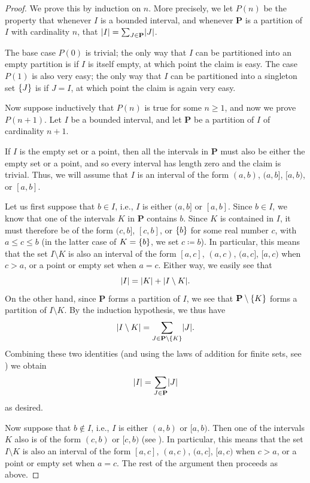 \begin{proof}
  We prove this by induction on \(n\).
  More precisely, we let \(P(n)\) be the property that whenever \(I\) is a bounded interval, and whenever \(\mathbf{P}\) is a partition of \(I\) with cardinality \(n\), that \(\abs{I} = \sum_{J \in \mathbf{P}} \abs{J}\).

  The base case \(P(0)\) is trivial;
  the only way that \(I\) can be partitioned into an empty partition is if \(I\) is itself empty, at which point the claim is easy.
  The case \(P(1)\) is also very easy;
  the only way that \(I\) can be partitioned into a singleton set \(\left\lbrace J\right\rbrace\) is if \(J = I\), at which point the claim is again very easy.

  Now suppose inductively that \(P(n)\) is true for some \(n \geq 1\), and now we prove \(P(n + 1)\).
  Let \(I\) be a bounded interval, and let \(\mathbf{P}\) be a partition of \(I\) of cardinality \(n + 1\).

  If \(I\) is the empty set or a point, then all the intervals in \(\mathbf{P}\) must also be either the empty set or a point, and so every interval has length zero and the claim is trivial.
  Thus, we will assume that \(I\) is an interval of the form \((a, b)\), \((a, b]\), \([a, b)\), or \([a, b]\).

      Let us first suppose that \(b \in I\), i.e., \(I\) is either \((a, b]\) or \([a, b]\).
  Since \(b \in I\), we know that one of the intervals \(K\) in \(\mathbf{P}\) contains \(b\).
  Since \(K\) is contained in \(I\), it must therefore be of the form \((c, b]\), \([c, b]\), or \(\left\lbrace b\right\rbrace\) for some real number \(c\), with \(a \leq c \leq b\) (in the latter case of \(K = \left\lbrace b\right\rbrace\), we set \(c \coloneqq b\)).
  In particular, this means that the set \(I \setminus K\) is also an interval of the form \([a, c]\), \((a, c)\), \((a, c]\), \([a, c)\) when \(c > a\), or a point or empty set when \(a = c\).
  Either way, we easily see that
  \[
    \abs{I} = \abs{K} + \abs{I \setminus K}.
  \]
  On the other hand, since \(\mathbf{P}\) forms a partition of \(I\), we see that \(\mathbf{P} \setminus \left\lbrace K\right\rbrace\) forms a partition of \(I \setminus K\).
  By the induction hypothesis, we thus have
  \[
    \abs{I \setminus K} = \sum_{J \in \mathbf{P} \setminus \set{K}} \abs{J}.
  \]
  Combining these two identities (and using the laws of addition for finite sets, see ) we obtain
  \[
    \abs{I} = \sum_{J \in \mathbf{P}} \abs{J}
  \]
  as desired.

  Now suppose that \(b \notin I\), i.e., \(I\) is either \((a, b)\) or \([a, b)\).
  Then one of the intervals \(K\) also is of the form \((c, b)\) or \([c, b)\) (see ).
      In particular, this means that the set \(I \setminus K\) is also an interval of the form \([a, c]\), \((a, c)\), \((a, c]\), \([a, c)\) when \(c > a\), or a point or empty set when \(a = c\).
  The rest of the argument then proceeds as above.
\end{proof}

